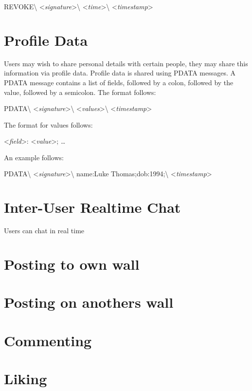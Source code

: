 \begin{center}
REVOKE\textbackslash
\textless \textit{signature}\textgreater\textbackslash
\textless \textit{time}\textgreater\textbackslash
\textless \textit{timestamp}\textgreater
\end{center}

\section{Profile Data}
Users may wish to share personal details with certain people, they may share
this information via profile data. Profile data is shared using PDATA messages.
A PDATA message contains a list of fields, followed by a colon, followed by the
value, followed by a semicolon. The format follows:

\begin{center}
PDATA\textbackslash
\textless \textit{signature}\textgreater\textbackslash
\textless \textit{values}\textgreater\textbackslash
\textless \textit{timestamp}\textgreater
\end{center}

The format for values follows:

\begin{center}
\textless \textit{field}\textgreater:
\textless \textit{value}\textgreater;
\ldots
\end{center}

An example follows:

\begin{center}
PDATA\textbackslash
\textless \textit{signature}\textgreater\textbackslash
name:Luke Thomas;dob:1994;\textbackslash
\textless \textit{timestamp}\textgreater
\end{center}

\section{Inter-User Realtime Chat}
Users can chat in real time

\section{Posting to own wall}

\section{Posting on anothers wall}

\section{Commenting}

\section{Liking}
